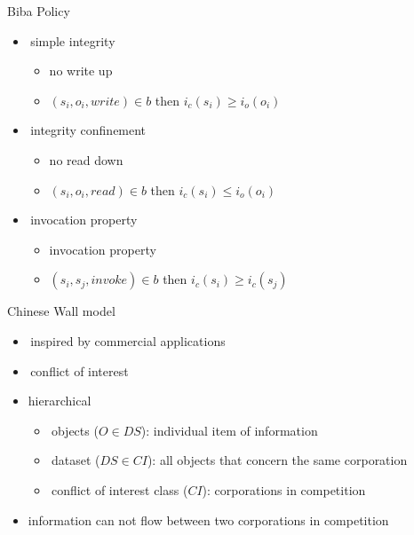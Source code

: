 \documentclass{beamer}
\begin{document}
\begin{frame}{Biba Policy}
  \begin{itemize}
    \item simple integrity
      \begin{itemize}
      \item no write up
      \item $(s_i, o_i, write) \in b$ then
        $i_c(s_i) \ge i_o(o_i)$
      \end{itemize}
    \item integrity confinement
      \begin{itemize}
      \item no read down
      \item $(s_i, o_i, read) \in b$ then
        $i_c(s_i) \le i_o(o_i)$
      \end{itemize}
    \item invocation property
      \begin{itemize}
      \item invocation property
      \item $(s_i, s_j, invoke) \in b$ then
        $i_c(s_i) \ge i_c(s_j)$
      \end{itemize}
  \end{itemize}
\end{frame}

\begin{frame}{Chinese Wall model}
  \begin{itemize}
    \item inspired by commercial applications
    \item conflict of interest
    \item hierarchical
      \begin{itemize}
      \item objects ($O \in DS$): individual item of information
      \item dataset ($DS \in CI$): all objects that concern the same corporation
      \item conflict of interest class ($CI$): corporations in competition
      \end{itemize}
    \item information can not flow between two corporations in competition
  \end{itemize}
\end{frame}
\end{document}
